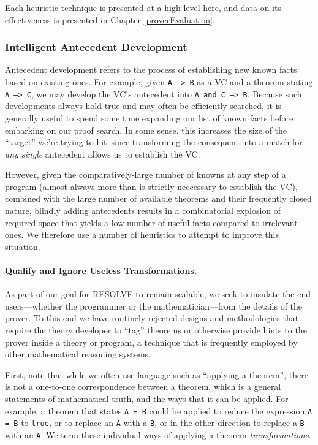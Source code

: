 Each heuristic technique is presented at a high level here, and data on its effectiveness is presented in Chapter \ref{proverEvaluation}.

		\subsubsection{Intelligent Antecedent Development}

Antecedent development refers to the process of establishing new known facts based on existing ones.  For example, given \texttt{A ---> B} as a VC and a theorem stating \texttt{A ---> C}, we may develop the VC's antecedent into \texttt{A and C ---> B}.  Because such developments always hold true and may often be efficiently searched, it is generally useful to spend some time expanding our list of known facts before embarking on our proof search.  In some sense, this increases the size of the ``target'' we're trying to hit--since transforming the consequent into a match for \emph{any single} antecedent allows us to establish the VC.

However, given the comparatively-large number of knowns at any step of a program (almost always more than is strictly neccessary to establish the VC), combined with the large number of available theorems and their frequently closed nature, blindly adding antecedents results in a combinatorial explosion of required space that yields a low number of useful facts compared to irrelevant ones.  We therefore use a number of heuristics to attempt to improve this situation.

\paragraph{Qualify and Ignore Useless Transformations.}  As part of our goal for RESOLVE to remain scalable, we seek to insulate the end users---whether the programmer or the mathematician---from the details of the prover.  To this end we have routinely rejected designs and methodologies that require the theory developer to ``tag'' theorems or otherwise provide hints to the prover inside a theory or program, a technique that is frequently employed by other mathematical reasoning systems\cite{something}.

First, note that while we often use language such as ``applying a theorem'', there is not a one-to-one correspondence between a theorem, which is a general statements of mathematical truth, and the ways that it can be applied.  For example, a theorem that states \texttt{A = B} could be applied to reduce the expression \texttt{A = B} to \texttt{true}, or to replace an \texttt{A} with a \texttt{B}, or in the other direction to replace a \texttt{B} with an \texttt{A}.  We term these individual ways of applying a theorem \emph{transformations}.

